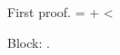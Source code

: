 \documentclass{article}
\makeatletter
\newcounter{proofcount}
\def\printproofs{\count@=\z@
  \loop \the\toks\numexpr\prooftoks+\count@\relax
  \ifnum\count@<\value{proofcount}\advance\count@\@ne \repeat}
\makeatother
\begin{document}
\proofatend First proof.\endproofatend
\printproofs

Block: \the\prooftoks.
\end{document}
